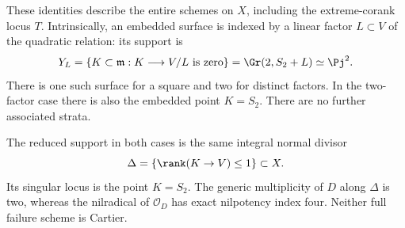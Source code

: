 \begin{theorem}
These identities describe the entire schemes on $X$, including the
extreme-corank locus $T$. Intrinsically, an embedded surface is indexed
by a linear factor $L\subset V$ of the quadratic relation: its support is
\begin{equation}\label{eq:loewy-factor-surface}
 Y_L=\{K\subset\mathfrak m:K\longrightarrow V/L\text{ is zero}\}
       =\Gr(2,S_2+L)\simeq\Pj^2.
\end{equation}
There is one such surface for a square and two for distinct factors.
In the two-factor case there is also the embedded point $K=S_2$.
There are no further associated strata.

The reduced support in both cases is the same integral normal divisor
\[
 \Delta=\{\rank(K\to V)\le1\}\subset X.
\]
Its singular locus is the point $K=S_2$. The generic multiplicity of
$D$ along $\Delta$ is two, whereas the nilradical of $\mathcal O_D$
has exact nilpotency index four. Neither full failure scheme is Cartier.
\end{theorem}
